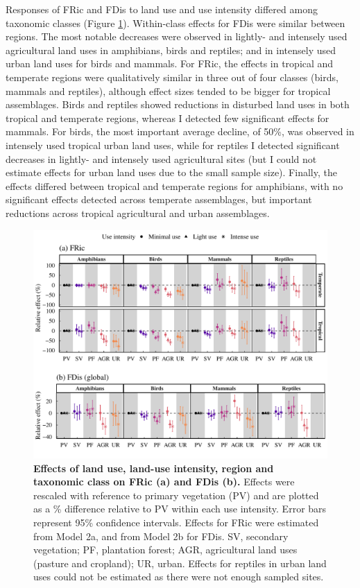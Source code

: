 Responses of FRic and FDis to land use and use intensity differed among taxonomic classes (Figure \ref{chap3_fig3}). Within-class effects for FDis were similar between regions. The most notable decreases were observed in lightly- and intensely used agricultural land uses in amphibians, birds and reptiles; and in intensely used urban land uses for birds and mammals. For FRic, the effects in tropical and temperate regions were qualitatively similar in three out of four classes (birds, mammals and reptiles), although effect sizes tended to be bigger for tropical assemblages. Birds and reptiles showed reductions in disturbed land uses in both tropical and temperate regions, whereas I detected few significant effects for mammals. For birds, the most important average decline, of 50\%, was observed in intensely used tropical urban land uses, while for reptiles I detected significant decreases in lightly- and intensely used agricultural sites (but I could not estimate effects for urban land uses due to the small sample size). Finally, the effects differed between tropical and temperate regions for amphibians, with no significant effects detected across temperate assemblages, but important reductions across tropical agricultural and urban assemblages.

\begin{figure}[h!]
\centering
\includegraphics[scale=0.75]{figures/Chapter_FD/Figure3}
\caption[Effects of land use, land-use intensity, region and taxonomic class on FRic (a) and FDis (b).]{\textbf{Effects of land use, land-use intensity, region and taxonomic class on FRic (a) and FDis (b).} Effects were rescaled with reference to primary vegetation (PV) and are plotted as a \% difference relative to PV within each use intensity. Error bars represent 95\% confidence intervals. Effects for FRic were estimated from Model 2a, and from Model 2b for FDis. SV, secondary vegetation; PF, plantation forest; AGR, agricultural land uses (pasture and cropland); UR, urban. Effects for reptiles in urban land uses could not be estimated as there were not enough sampled sites.}
\label{chap3_fig3}
\end{figure}

